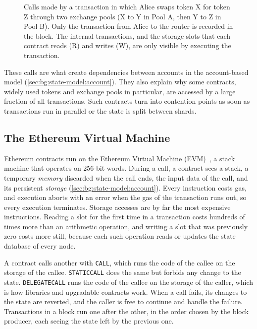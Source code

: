 \begin{figure}[t]
	\centering
	\resizebox{\linewidth}{!}{}
	\caption{Calls made by a transaction in which Alice swaps token X for token Z through two exchange pools (X to Y in Pool A, then Y to Z in Pool B).
		Only the transaction from Alice to the router is recorded in the block.
		The internal transactions, and the storage slots that each contract reads (R) and writes (W), are only visible by executing the transaction.}
	\label{fig:bg:calltree}
\end{figure}

These calls are what create dependencies between accounts in the account-based model (\autoref{sec:bg:state-model:account}).
They also explain why some contracts, widely used tokens and exchange pools in particular, are accessed by a large fraction of all transactions.
Such contracts turn into contention points as soon as transactions run in parallel or the state is split between shards.

\subsection{The Ethereum Virtual Machine}\label{sec:bg:execution:evm}

Ethereum contracts run on the Ethereum Virtual Machine (EVM)~\cite{wood2014ethereum}, a stack machine that operates on 256-bit words.
During a call, a contract sees a stack, a temporary \emph{memory} discarded when the call ends, the input data of the call, and its persistent \emph{storage} (\autoref{sec:bg:state-model:account}).
Every instruction costs gas, and execution aborts with an error when the gas of the transaction runs out, so every execution terminates.
Storage accesses are by far the most expensive instructions.
Reading a slot for the first time in a transaction costs hundreds of times more than an arithmetic operation, and writing a slot that was previously zero costs more still, because each such operation reads or updates the state database of every node.

A contract calls another with \texttt{CALL}, which runs the code of the callee on the storage of the callee.
\texttt{STATICCALL} does the same but forbids any change to the state.
\texttt{DELEGATECALL} runs the code of the callee on the storage of the caller, which is how libraries and upgradable contracts work.
When a call fails, its changes to the state are reverted, and the caller is free to continue and handle the failure.
Transactions in a block run one after the other, in the order chosen by the block producer, each seeing the state left by the previous one.

